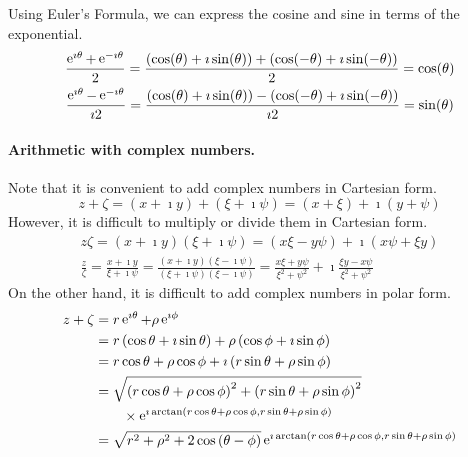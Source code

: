 Using Euler's Formula, we can express the cosine and sine in terms of the
exponential.
\begin{gather*}
  \frac{\mathop{\mathrm{e}}\nolimits^{\imath \theta} + \mathop{\mathrm{e}}\nolimits^{-\imath \theta}}{2}
  = \frac{(\cos(\theta) + \imath \sin(\theta)) + (\cos(-\theta) + \imath \sin(-\theta))}{2}
  = \cos(\theta)
  \\
  \frac{\mathop{\mathrm{e}}\nolimits^{\imath \theta} - \mathop{\mathrm{e}}\nolimits^{-\imath \theta}}{\imath 2}
  = \frac{(\cos(\theta) + \imath \sin(\theta)) - (\cos(-\theta) + \imath \sin(-\theta))}{\imath 2}
  = \sin(\theta)
\end{gather*}






\paragraph{Arithmetic with complex numbers.}
Note that it is convenient to add complex numbers in Cartesian form.
\[
z + \zeta
= \left( x + \imath y \right) + \left( \xi + \imath \psi \right) 
= \left( x + \xi \right) + \imath \left( y + \psi \right)
\]
However, it is difficult to multiply or divide them in Cartesian form.
\begin{gather*}
  z \zeta
  = \left( x + \imath y \right)  \left( \xi + \imath \psi \right) 
  = \left( x \xi - y \psi \right) + \imath \left( x \psi + \xi y \right)
  \\
  \frac{z}{\zeta}
  = \frac{x + \imath y}{\xi + \imath \psi}
  = \frac{\left( x + \imath y \right)  \left( \xi - \imath \psi \right)}
  {\left( \xi + \imath \psi \right)  \left( \xi - \imath \psi \right)}
  = \frac{x \xi + y \psi}{\xi^2 + \psi^2}
  + \imath \frac{\xi y - x \psi}{\xi^2 + \psi^2}
\end{gather*}
On the other hand, it is difficult to add complex numbers in polar form.
\begin{align*}
  z + \zeta
  &= r \mathop{\mathrm{e}}\nolimits^{\imath \theta} + \rho \mathop{\mathrm{e}}\nolimits^{\imath \phi}
  \\
  &= r \left( \cos \theta + \imath \sin \theta \right) 
  + \rho \left( \cos \phi + \imath \sin \phi \right) 
  \\
  &= r \cos \theta + \rho \cos \phi
  + \imath \left( r \sin \theta + \rho \sin \phi \right) 
  \\
  &= \sqrt{ \left( r \cos \theta + \rho \cos \phi \right)^2
    + \left( r \sin \theta + \rho \sin \phi \right)^2 } 
  \\
  &\qquad \times \mathop{\mathrm{e}}\nolimits^{\imath \arctan \left( 
      r \cos \theta + \rho \cos \phi, 
      r \sin \theta + \rho \sin \phi \right)} 
  \\
  &= \sqrt{ r^2 + \rho^2 + 2 \cos \left( \theta - \phi \right) }
  \mathop{\mathrm{e}}\nolimits^{\imath \arctan \left( 
      r \cos \theta + \rho \cos \phi,
      r \sin \theta + \rho \sin \phi \right)} 
\end{align*}
